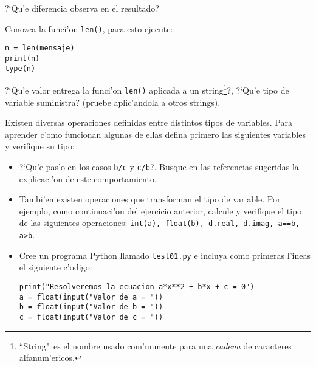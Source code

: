 \documentclass[11pt]{exam}
\begin{document}
\begin{questions}
\begin{parts}
?`Qu'e diferencia observa en el resultado?
\item Conozca la funci'on \texttt{len()}, para esto ejecute:

\begin{verbatim}
n = len(mensaje)
print(n)
type(n)
\end{verbatim}

?`Qu'e valor entrega la funci'on \texttt{len()} aplicada a un string\footnote{``String"\, es el nombre usado com'unmente para una \textit{cadena} de caracteres alfanum'ericos.}?, ?`Qu'e tipo de variable suministra? (pruebe aplic'andola a otros strings).

\end{parts}
\item Existen diversas operaciones definidas entre distintos tipos de variables. Para aprender c'omo funcionan algunas de ellas defina primero las siguientes variables y verifique su tipo:
\begin{itemize}

\begin{verbatim}
a = 3.14
b = 2
c = 5
d = 6+2j
e = "hola "
f = "mechones"
g = True
\end{verbatim}
A continuaci'on imprima el valor y el tipo del resultado de las siguientes operaciones: \texttt{a+b, a+d, a+e, b+c, b+d, b+e, f+e, e+f, a*b, a*d, a*e, b*c, b*d, c*e, e*f, a**b, a**d, a**e, b**c, e**a, e**b, e**f, a/b, a/d, a/e, b/c, b/d, b/e, c/b, d/a, d/b, e/a, e/b, e/f,  a*g, b*g, not(g), g and False, g and True, g or False, g or True}. ?`Cu'ales de estas operaciones no est'an definidas?
\item ?`Qu'e pas'o en los casos \texttt{b/c} y \texttt{c/b}?. Busque en las referencias sugeridas la explicaci'on de este comportamiento.
\item Tambi'en existen operaciones que transforman el tipo de variable. Por ejemplo, como continuaci'on del ejercicio anterior, calcule y verifique el tipo de las siguientes operaciones: \texttt{int(a), float(b), d.real, d.imag, a==b, a>b}.

\item Cree un programa Python llamado \texttt{test01.py} e incluya como primeras l'ineas el siguiente c'odigo:

\begin{verbatim}
print("Resolveremos la ecuacion a*x**2 + b*x + c = 0")
a = float(input("Valor de a = "))
b = float(input("Valor de b = "))
c = float(input("Valor de c = "))
\end{verbatim}


\end{itemize}
\end{questions}
\end{document}
